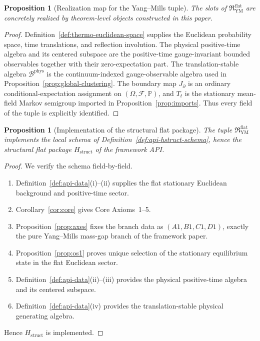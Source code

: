 \documentclass[11pt]{article}
\newtheorem{proposition}[theorem]{Proposition}
\theoremstyle{definition}
\theoremstyle{remark}
\newcommand{\mcB}{\mathcal B}
\begin{document}
\begin{proposition}[Realization map for the Yang--Mills tuple]
\label{prop:api-field-map}
The slots of \(\mathfrak R_{\mathrm{YM}}^{\mathrm{flat}}\) are concretely
realized by theorem-level objects constructed in this paper.
\end{proposition}

\begin{proof}
Definition~\ref{def:thermo-euclidean-space} supplies the Euclidean probability
space, time translations, and reflection involution.  The physical positive-time
algebra and its centered subspace are the positive-time gauge-invariant bounded
observables together with their zero-expectation part.  The translation-stable
algebra \(\mcB^{\mathrm{phys}}\) is the continuum-indexed gauge-observable
algebra used in Proposition~\ref{prop:global-clustering}.  The boundary map
\(J_{\partial}\) is an ordinary conditional-expectation assignment on
\((\Omega,\mathcal F,\mathbb P)\), and \(T_t\) is the stationary mean-field
Markov semigroup imported in Proposition~\ref{prop:imports}.  Thus every field
of the tuple is explicitly identified.
\end{proof}

\begin{proposition}[Implementation of the structural flat package]
\label{prop:api-hstruct}
The tuple \(\mathfrak R_{\mathrm{YM}}^{\mathrm{flat}}\) implements the local
schema of Definition~\ref{def:api-hstruct-schema}, hence the structural flat
package \(H_{\mathrm{struct}}\) of the framework API.
\end{proposition}

\begin{proof}
We verify the schema field-by-field.
\begin{enumerate}[label=\textnormal{(H\arabic*)},leftmargin=1.5em]
\item Definition~\ref{def:api-data}\textnormal{(i)--(ii)} supplies the flat
stationary Euclidean background and positive-time sector.
\item Corollary~\ref{cor:core} gives Core Axioms~1--5.
\item Proposition~\ref{prop:axes} fixes the branch data as
\((A1,B1,C1,D1)\), exactly the pure Yang--Mills mass-gap branch of the
framework paper.
\item Proposition~\ref{prop:os1} proves unique selection of the stationary
equilibrium state in the flat Euclidean sector.
\item Definition~\ref{def:api-data}\textnormal{(ii)--(iii)} provides the
physical positive-time algebra and its centered subspace.
\item Definition~\ref{def:api-data}\textnormal{(iv)} provides the
translation-stable physical generating algebra.
\end{enumerate}
Hence \(H_{\mathrm{struct}}\) is implemented.
\end{proof}
\end{document}
